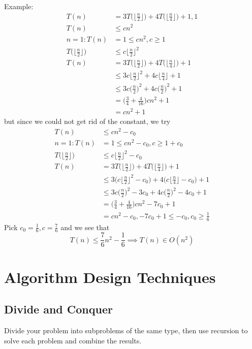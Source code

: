 \documentclass[12pt]{article}
\begin{document}
Example:
\begin{align*}
T(n) &= 3T\bigg(\bigg\lfloor \frac{n}{2} \bigg\rfloor\bigg) + 4T\bigg(\bigg\lfloor \frac{n}{4} \bigg\rfloor\bigg) + 1, 1 \\
T(n) &\leq cn^2 \\
n = 1: T(n) &= 1 \leq cn^2, c \geq 1 \\
T\bigg(\bigg\lfloor \frac{n}{2} \bigg\rfloor\bigg) &\leq c\bigg\lfloor \frac{n}{2} \bigg\rfloor^2 \\
T(n) &= 3T\bigg(\bigg\lfloor \frac{n}{2} \bigg\rfloor\bigg) + 4T\bigg(\bigg\lfloor \frac{n}{4} \bigg\rfloor\bigg) + 1 \\
     &\leq 3c \bigg\lfloor \frac{n}{2} \bigg\rfloor^2 + 4c\bigg\lfloor \frac{n}{4} \bigg\rfloor + 1 \\
     &\leq 3c \bigg(\frac{n}{2}\bigg)^2 + 4c \bigg(\frac{n}{2}\bigg)^2 + 1 \\
     &= \bigg(\frac{3}{4} + \frac{4}{16}\bigg)cn^2 + 1 \\
     &= cn^2 + 1
\end{align*}
but since we could not get rid of the constant, we try
\begin{align*}
T(n) &\leq cn^2 - c_0 \\
n = 1: T(n) &= 1 \leq cn^2 - c_0, c \geq 1 + c_0 \\
T\bigg(\bigg\lfloor \frac{n}{2} \bigg\rfloor\bigg) &\leq c\bigg\lfloor \frac{n}{2} \bigg\rfloor^2 - c_0 \\
T(n) &= 3T\bigg(\bigg\lfloor \frac{n}{2} \bigg\rfloor\bigg) + 4T\bigg(\bigg\lfloor \frac{n}{4} \bigg\rfloor\bigg) + 1 \\
     &\leq 3\bigg(c \bigg\lfloor \frac{n}{2} \bigg\rfloor^2 - c_0\bigg) + 4\bigg(c\bigg\lfloor \frac{n}{4} \bigg\rfloor - c_0\bigg) + 1 \\
     &\leq 3c \bigg(\frac{n}{2}\bigg)^2 - 3c_0 + 4c \bigg(\frac{n}{2}\bigg)^2 - 4c_0 + 1 \\
     &= \bigg(\frac{3}{4} + \frac{4}{16}\bigg)cn^2 - 7c_0 + 1 \\
     &= cn^2 - c_0, -7c_0 + 1 \leq -c_0, c_0 \geq \frac{1}{6}
\end{align*}
Pick $c_0 = \frac{1}{6}, c = \frac{7}{6}$ and we see that \[ T(n) \leq \frac{7}{6}n^2 - \frac{1}{6} \implies T(n) \in O(n^2) \]

\section{Algorithm Design Techniques}
\subsection{Divide and Conquer}
Divide your problem into subproblems of the same type, then use recursion to solve each problem and combine the results.
\end{document}
